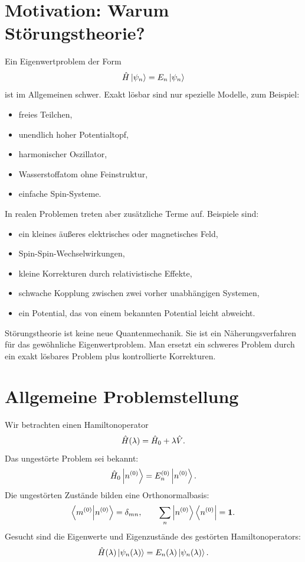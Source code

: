 \section{Motivation: Warum Störungstheorie?}

Ein Eigenwertproblem der Form
\[
    \hat H\left|\psi_n\right\rangle=E_n\left|\psi_n\right\rangle
\]
ist im Allgemeinen schwer. Exakt lösbar sind nur spezielle Modelle, zum Beispiel:
\begin{itemize}
    \item freies Teilchen,
    \item unendlich hoher Potentialtopf,
    \item harmonischer Oszillator,
    \item Wasserstoffatom ohne Feinstruktur,
    \item einfache Spin-Systeme.
\end{itemize}

In realen Problemen treten aber zusätzliche Terme auf. Beispiele sind:
\begin{itemize}
    \item ein kleines äußeres elektrisches oder magnetisches Feld,
    \item Spin-Spin-Wechselwirkungen,
    \item kleine Korrekturen durch relativistische Effekte,
    \item schwache Kopplung zwischen zwei vorher unabhängigen Systemen,
    \item ein Potential, das von einem bekannten Potential leicht abweicht.
\end{itemize}

\begin{notebox}
Störungstheorie ist keine neue Quantenmechanik. Sie ist ein Näherungsverfahren für das gewöhnliche Eigenwertproblem. Man ersetzt ein schweres Problem durch ein exakt lösbares Problem plus kontrollierte Korrekturen.
\end{notebox}

\section{Allgemeine Problemstellung}

Wir betrachten einen Hamiltonoperator
\[
    \hat H(\lambda)=\hat H_0+\lambda\hat V.
\]
Das ungestörte Problem sei bekannt:
\[
    \hat H_0\left|n^{(0)}\right\rangle=E_n^{(0)}\left|n^{(0)}\right\rangle.
\]
Die ungestörten Zustände bilden eine Orthonormalbasis:
\[
    \left\langle m^{(0)}\middle|n^{(0)}\right\rangle=\delta_{mn},
    \qquad
    \sum_n \left|n^{(0)}\right\rangle\left\langle n^{(0)}\right|=\mathbf{1}.
\]
Gesucht sind die Eigenwerte und Eigenzustände des gestörten Hamiltonoperators:
\[
    \hat H(\lambda)\left|\psi_n(\lambda)\right\rangle=E_n(\lambda)\left|\psi_n(\lambda)\right\rangle.
\]

